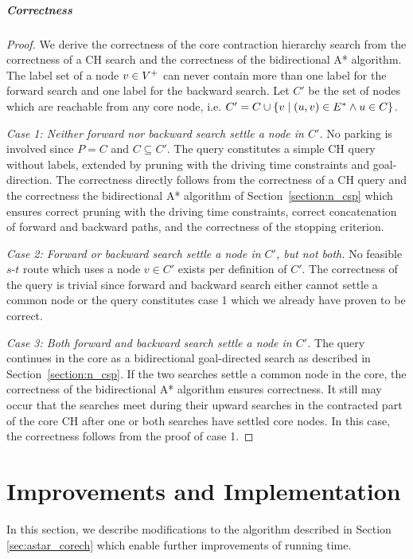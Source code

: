 \subparagraph{Correctness}
\begin{proof}
	We derive the correctness of the core contraction hierarchy search from the correctness of a CH search and the correctness of the bidirectional A* algorithm. The label set of a node $v \in V^+$ can never contain more than one label for the forward search and one label for the backward search. Let $C'$ be the set of nodes which are reachable from any core node, i.e. $C' = C \cup \{v \mid (u,v) \in E^* \wedge u \in C\}$.

	\emph{Case 1: Neither forward nor backward search settle a node in $C'$.} No parking is involved since $P = C$ and $C \subseteq C'$. The query constitutes a simple CH query without labels, extended by pruning with the driving time constraints and goal-direction. The correctness directly follows from the correctness of a CH query and the correctness the bidirectional A* algorithm of Section~\ref{section:n_csp} which ensures correct pruning with the driving time constraints, correct concatenation of forward and backward paths, and the correctness of the stopping criterion.

	\emph{Case 2: Forward or backward search settle a node in $C'$, but not both.} No feasible $s$-$t$ route which uses a node $v \in C'$ exists per definition of $C'$. The correctness of the query is trivial since forward and backward search either cannot settle a common node or the query constitutes case 1 which we already have proven to be correct.

	\emph{Case 3: Both forward and backward search settle a node in $C'$.} The query continues in the core as a bidirectional goal-directed search as described in Section~\ref{section:n_csp}. If the two searches settle a common node in the core, the correctness of the bidirectional A* algorithm ensures correctness. It still may occur that the searches meet during their upward searches in the contracted part of the core CH after one or both searches have settled core nodes. In this case, the correctness follows from the proof of case 1.
\end{proof}

\section{Improvements and Implementation\label{section:impl}}
In this section, we describe modifications to the algorithm described in Section \ref{sec:astar_corech} which enable further improvements of running time.

